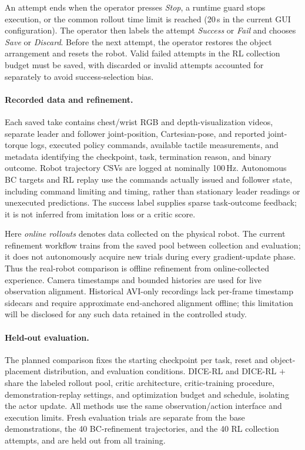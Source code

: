 An attempt ends when the operator presses \emph{Stop}, a runtime guard stops
execution, or the common rollout time limit is reached (20\,s in the current
GUI configuration). The operator then labels the attempt \emph{Success} or
\emph{Fail} and chooses \emph{Save} or \emph{Discard}. Before the next attempt,
the operator restores the object arrangement and resets the robot. Valid
failed attempts in the RL collection budget must be saved, with discarded
or invalid attempts accounted for separately to avoid success-selection bias.

\paragraph{Recorded data and refinement.}
Each saved take contains chest/wrist RGB and depth-visualization videos,
separate leader and follower joint-position, Cartesian-pose, and reported
joint-torque logs, executed policy
commands, available tactile measurements, and metadata identifying the
checkpoint, task, termination reason, and binary outcome. Robot trajectory
CSVs are logged at nominally 100\,Hz. Autonomous BC targets and RL replay use
the commands actually issued and follower state, including command limiting
and timing, rather than stationary leader readings or unexecuted predictions.
The success label supplies sparse task-outcome feedback; it is not inferred
from imitation loss or a critic score.

Here \emph{online rollouts} denotes data collected on the physical robot.
The current refinement workflow trains from the saved pool between collection
and evaluation; it does not autonomously acquire new trials during every
gradient-update phase. Thus the real-robot comparison is offline refinement
from online-collected experience. Camera timestamps and bounded histories are
used for live observation alignment. Historical AVI-only recordings lack
per-frame timestamp sidecars and require approximate end-anchored alignment
offline; this limitation will be disclosed for any such data retained in the
controlled study.

\paragraph{Held-out evaluation.}
The planned comparison fixes the starting checkpoint per task, reset and
object-placement distribution, and evaluation conditions. DICE-RL and
DICE-RL $+$ \method{} share the labeled rollout pool, critic architecture,
critic-training procedure, demonstration-replay settings, and optimization
budget and schedule, isolating the actor update. All methods use the same
observation/action interface and execution limits. Fresh evaluation trials
are separate from the base demonstrations, the 40 BC-refinement trajectories,
and the 40 RL collection attempts, and are held out from all training.


